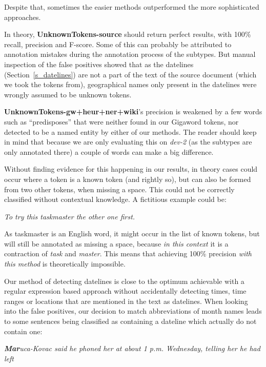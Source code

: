 \documentclass[a4paper,10pt]{scrartcl}
\theoremstyle{style}
\begin{document}
Despite that, sometimes the easier methods outperformed the more sophisticated approaches.

In theory, \textbf{UnknownTokens-source} should return perfect results, with 100\% recall, precision and F-score. Some of this can probably be attributed to annotation mistakes during the annotation process of the subtypes. But manual inspection of the false positives showed that as the datelines (Section~\ref{s_datelines}) are not a part of the text of the source document (which we took the tokens from), geographical names only present in the datelines were wrongly assumed to be unknown tokens.

\textbf{UnknownTokens-gw+heur+ner+wiki}'s precision is weakened by a few words such as ``predisposes'' that were neither found in our Gigaword tokens, nor detected to be a named entity by either of our methods. The reader should keep in mind that because we are only evaluating this on \textit{dev-2} (as the subtypes are only annotated there) a couple of words can make a big difference.

Without finding evidence for this happening in our results, in theory cases could occur where a token is a known token (and rightly so), but can also be formed from two other tokens, when missing a space. This could not be correctly classified without contextual knowledge. A fictitious example could be:

\quad\textit{To try this taskmaster the other one first.}

As taskmaster is an English word, it might occur in the list of known tokens, but will still be annotated as missing a space, because \textit{in this context} it is a contraction of \textit{task} and \textit{master}.
This means that achieving 100\% precision \textit{with this method} is theoretically impossible.

Our method of detecting datelines is close to the optimum achievable with a regular expression based approach without accidentally detecting times, time ranges or locations that are mentioned in the text as datelines.
When looking into the false positives, our decision to match abbreviations of month names leads to some sentences being classified as containing a dateline which actually do not contain one:

\quad\textit{\textbf{Mar}uca-Kovac said he phoned her at about 1 p.m. Wednesday, telling her he had left}

\end{document}
